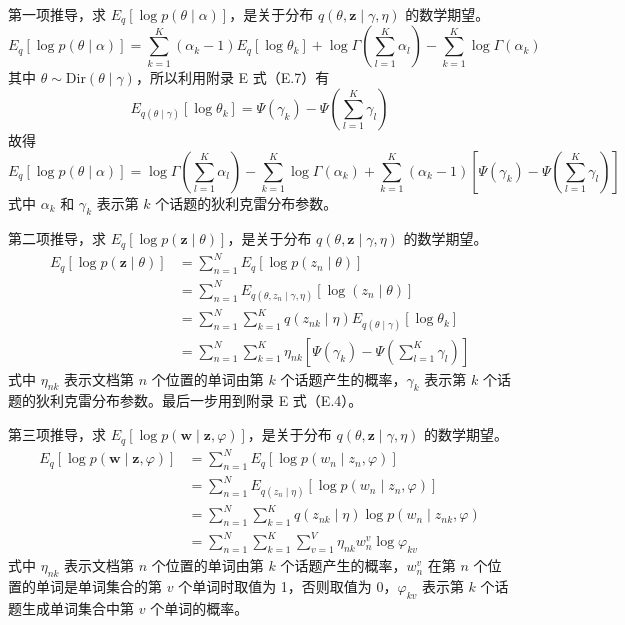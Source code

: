 \documentclass[UTF8, 12pt, fontset=fandol, oneside]{ctexart}
\begin{document}
第一项推导，求 $E_q[\log p(\theta\mid\alpha)]$，是关于分布 $q(\theta,\mathbf{z}\mid\gamma,\eta)$ 的数学期望。
\begin{equation}
E_q[\log p(\theta\mid\alpha)]=\sum_{k=1}^K(\alpha_k-1)E_q[\log\theta_k]+\log\Gamma\left(\sum_{l=1}^K\alpha_l\right)-\sum_{k=1}^K\log\Gamma(\alpha_k)
\tag{20.49}
\end{equation}
其中 $\theta\sim\mathrm{Dir}(\theta\mid\gamma)$，所以利用附录 E 式（E.7）有
\begin{equation}
E_{q(\theta\mid\gamma)}[\log\theta_k]=\Psi(\gamma_k)-\Psi\left(\sum_{l=1}^K\gamma_l\right)
\tag{20.50}
\end{equation}
故得
\begin{equation}
E_q[\log p(\theta\mid\alpha)]=\log\Gamma\left(\sum_{l=1}^K\alpha_l\right)-\sum_{k=1}^K\log\Gamma(\alpha_k)+\sum_{k=1}^K(\alpha_k-1)\left[\Psi(\gamma_k)-\Psi\left(\sum_{l=1}^K\gamma_l\right)\right]
\tag{20.51}
\end{equation}
式中 $\alpha_k$ 和 $\gamma_k$ 表示第 $k$ 个话题的狄利克雷分布参数。

第二项推导，求 $E_q[\log p(\mathbf{z}\mid\theta)]$，是关于分布 $q(\theta,\mathbf{z}\mid\gamma,\eta)$ 的数学期望。
\begin{equation}
\begin{aligned}
E_q[\log p(\mathbf{z}\mid\theta)]
&=\sum_{n=1}^N E_q[\log p(z_n\mid\theta)]\\
&=\sum_{n=1}^N E_{q(\theta,z_n\mid\gamma,\eta)}[\log(z_n\mid\theta)]\\
&=\sum_{n=1}^N\sum_{k=1}^K q(z_{nk}\mid\eta)E_{q(\theta\mid\gamma)}[\log\theta_k]\\
&=\sum_{n=1}^N\sum_{k=1}^K \eta_{nk}\left[\Psi(\gamma_k)-\Psi\left(\sum_{l=1}^K\gamma_l\right)\right]
\end{aligned}
\tag{20.52}
\end{equation}
式中 $\eta_{nk}$ 表示文档第 $n$ 个位置的单词由第 $k$ 个话题产生的概率，$\gamma_k$ 表示第 $k$ 个话题的狄利克雷分布参数。最后一步用到附录 E 式（E.4）。

第三项推导，求 $E_q[\log p(\mathbf{w}\mid\mathbf{z},\varphi)]$，是关于分布 $q(\theta,\mathbf{z}\mid\gamma,\eta)$ 的数学期望。
\begin{equation}
\begin{aligned}
E_q[\log p(\mathbf{w}\mid\mathbf{z},\varphi)]
&=\sum_{n=1}^N E_q[\log p(w_n\mid z_n,\varphi)]\\
&=\sum_{n=1}^N E_{q(z_n\mid\eta)}[\log p(w_n\mid z_n,\varphi)]\\
&=\sum_{n=1}^N\sum_{k=1}^K q(z_{nk}\mid\eta)\log p(w_n\mid z_{nk},\varphi)\\
&=\sum_{n=1}^N\sum_{k=1}^K\sum_{v=1}^V \eta_{nk}w_n^v\log\varphi_{kv}
\end{aligned}
\tag{20.53}
\end{equation}
式中 $\eta_{nk}$ 表示文档第 $n$ 个位置的单词由第 $k$ 个话题产生的概率，$w_n^v$ 在第 $n$ 个位置的单词是单词集合的第 $v$ 个单词时取值为 1，否则取值为 0，$\varphi_{kv}$ 表示第 $k$ 个话题生成单词集合中第 $v$ 个单词的概率。
\end{document}
